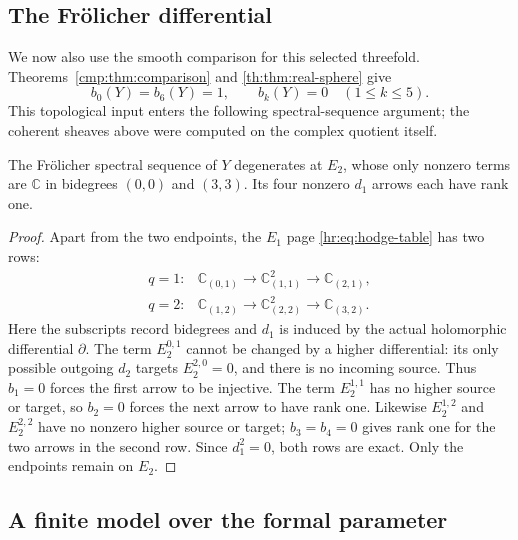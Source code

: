 \subsection{The Fr\"olicher differential}

We now also use the smooth comparison for this selected
threefold. Theorems~\ref{cmp:thm:comparison} and
\ref{th:thm:real-sphere} give
\begin{equation}\label{hr:eq:betti}
 b_0(Y)=b_6(Y)=1,\qquad b_k(Y)=0\quad(1\le k\le5).
\end{equation}
This topological input enters the following spectral-sequence
argument; the coherent sheaves above were computed on the
complex quotient itself.

\begin{proposition}\label{hr:prop:frolicher}
The Fr\"olicher spectral sequence of $Y$ degenerates at
$E_2$, whose only nonzero terms are $\mathbb C$ in
bidegrees $(0,0)$ and $(3,3)$. Its four nonzero $d_1$
arrows each have rank one.
\end{proposition}

\begin{proof}
Apart from the two endpoints, the $E_1$ page
\eqref{hr:eq:hodge-table} has two rows:
\[
 \begin{array}{ccl}
 q=1:&
 \mathbb C_{(0,1)}\longrightarrow
 \mathbb C^2_{(1,1)}\longrightarrow
 \mathbb C_{(2,1)},\\[2pt]
 q=2:&
 \mathbb C_{(1,2)}\longrightarrow
 \mathbb C^2_{(2,2)}\longrightarrow
 \mathbb C_{(3,2)}.
 \end{array}
\]
Here the subscripts record bidegrees and $d_1$ is induced
by the actual holomorphic differential $\partial$.
The term $E_2^{0,1}$ cannot be changed by a higher
differential: its only possible outgoing $d_2$ targets
$E_2^{2,0}=0$, and there is no incoming source.
Thus $b_1=0$ forces the first arrow to be injective.
The term $E_2^{1,1}$ has no higher source or target, so
$b_2=0$ forces the next arrow to have rank one.
Likewise $E_2^{1,2}$ and $E_2^{2,2}$ have no nonzero
higher source or target; $b_3=b_4=0$ gives rank one
for the two arrows in the second row.
Since $d_1^2=0$, both rows are exact.
Only the endpoints remain on $E_2$.
\end{proof}

\subsection{A finite model over the formal parameter}

